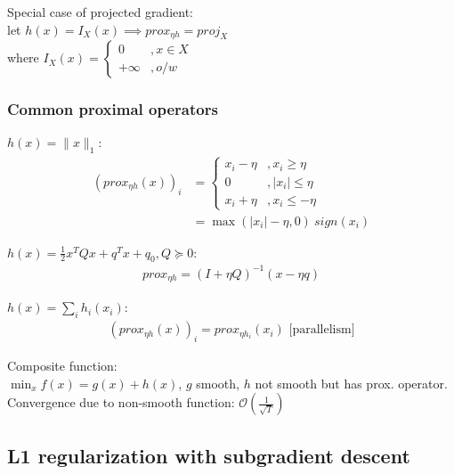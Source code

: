 \documentclass[8pt,letter]{article}
\begin{document}
\begin{multicols*}{2}
    Special case of projected gradient:\\
    let $h(x)=I_X(x) \implies prox_{\eta h} = proj_X$\\
    where $I_X(x) =
    \begin{cases}
      0 &, x \in X\\
      +\infty &, o/w
    \end{cases}$

    \subsubsection{Common proximal operators}
    $h(x) = \|x\|_1$:
    \begin{align*}
      (prox_{\eta h}(x))_i & = \begin{cases}
        x_i - \eta &, x_i \geq \eta\\
        0 &, |x_i| \leq \eta\\
        x_i + \eta &, x_i \leq -\eta
      \end{cases}\\
      & = \max(|x_i|-\eta,0)\ sign(x_i)
    \end{align*}
    
    $h(x)=\frac{1}{2} x^T Q x + q^T x + q_0, Q \succeq 0$:
    \begin{align*}
      prox_{\eta h} = (I + \eta Q)^{-1} (x- \eta q)
    \end{align*}

    $h(x)=\sum_i h_i(x_i)$:
    \begin{align*}
      (prox_{\eta h}(x))_i = prox_{\eta h_i}(x_i) \text{ [parallelism]}
    \end{align*}

    Composite function:\\
    $\min_x f(x) = g(x) + h(x)$, $g$ smooth, $h$ not smooth but has prox. operator. Convergence due to non-smooth function: $\mathcal{O}(\frac{1}{\sqrt{T}})$

    \subsection{L1 regularization with subgradient descent}
    

\end{multicols*}
\end{document}
